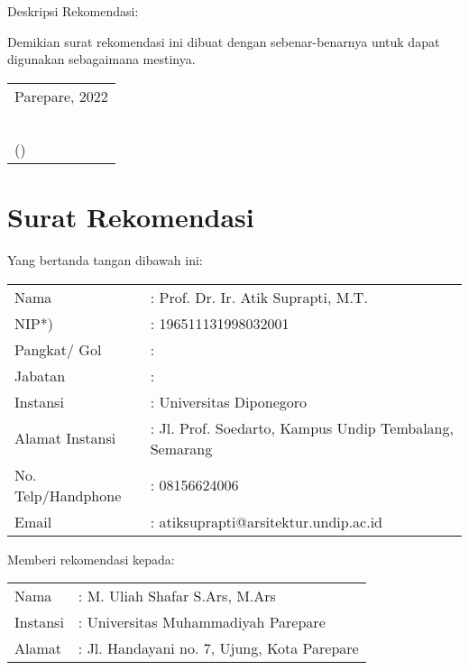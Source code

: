 \documentclass[12pt]{article}
\newcommand{\makenonemptybox}[2]{%
\fbox{%
\parbox[c][#1][t]{\dimexpr\linewidth-2\fboxsep-2\fboxrule}{
  \hrule width \hsize height 0pt
  #2
 }%
}%
\par\vspace{\ht\strutbox}
}
\newcommand\fillin[1][3cm]{\makebox[#1]{\dotfill}}
\begin{document}
Deskripsi Rekomendasi:

\makenonemptybox{5cm}{}

Demikian surat rekomendasi ini dibuat dengan sebenar-benarnya untuk dapat digunakan sebagaimana mestinya.


{\raggedleft
\begin{tabular}{l@{}}
Parepare, \fillin[3cm] 2022 \\
\hskip 2em (yang merekomendasi) \\
\\
\\
\\
\\
(\fillin[6cm])\\
\end{tabular}\par}

\pagebreak

\section{Surat Rekomendasi}

Yang bertanda tangan dibawah ini:
\vspace*{-4mm}

\begin{table}[htpb]
\renewcommand{\arraystretch}{1.25}
    \begin{tabularx}{\textwidth}{p{4cm}X}
Nama & : Prof. Dr. Ir. Atik Suprapti,  M.T.   \\
NIP*) & : 196511131998032001 \\
Pangkat/ Gol & : \\
Jabatan & : \\
Instansi & : Universitas Diponegoro\\
Alamat Instansi & : Jl. Prof. Soedarto, Kampus Undip Tembalang, Semarang \\
No. Telp/Handphone &: 08156624006 \\
Email & : atiksuprapti@arsitektur.undip.ac.id  \\
    \end{tabularx}
\end{table}

Memberi rekomendasi kepada:
\vspace*{-4mm}
\begin{table}[htpb]
    \begin{tabular}{p{4cm}l}
Nama & : M. Uliah Shafar S.Ars, M.Ars\\
Instansi & : Universitas Muhammadiyah Parepare \\
Alamat & : Jl. Handayani no. 7, Ujung, Kota Parepare \\
    \end{tabular}
\end{table}
\end{document}
